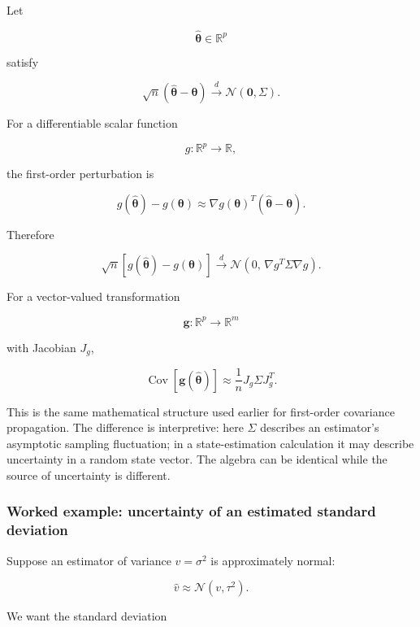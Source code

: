 Let

\[
\widehat{\boldsymbol\theta}\in\mathbb R^p
\]

satisfy

\[
\sqrt n
(\widehat{\boldsymbol\theta}-\boldsymbol\theta)
\xrightarrow{d}
\mathcal N(\mathbf 0,\Sigma).
\]

For a differentiable scalar function

\[
g:\mathbb R^p\to\mathbb R,
\]

the first-order perturbation is

\[
g(\widehat{\boldsymbol\theta})
-
g(\boldsymbol\theta)
\approx
\nabla g(\boldsymbol\theta)^T
(\widehat{\boldsymbol\theta}-\boldsymbol\theta).
\]

Therefore

\[
\boxed{
\sqrt n
\left[
g(\widehat{\boldsymbol\theta})
-
g(\boldsymbol\theta)
\right]
\xrightarrow{d}
\mathcal N
\left(
0,\,
\nabla g^T
\Sigma
\nabla g
\right)
}.
\]

For a vector-valued transformation

\[
\mathbf g:\mathbb R^p\to\mathbb R^m
\]

with Jacobian \(J_g\),

\[
\boxed{
\operatorname{Cov}
\left[
\mathbf g(\widehat{\boldsymbol\theta})
\right]
\approx
\frac1n
J_g
\Sigma
J_g^T
}.
\]

This is the same mathematical structure used earlier for first-order covariance propagation. The difference is interpretive: here \(\Sigma\) describes an estimator's asymptotic sampling fluctuation; in a state-estimation calculation it may describe uncertainty in a random state vector. The algebra can be identical while the source of uncertainty is different.

\begin{allmightroleexample}

\subsubsection{Worked example: uncertainty of an estimated standard deviation}\label{02-foundations-ii-ch030-worked-example-uncertainty-of-an-estimated-standard-deviation}

Suppose an estimator of variance \(v=\sigma^2\) is approximately normal:

\end{allmightroleexample}

\[
\widehat v
\approx
\mathcal N(v,\tau^2).
\]

We want the standard deviation

